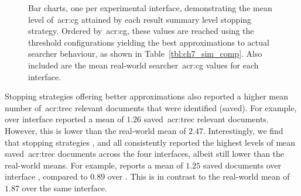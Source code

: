 \begin{figure}[p!]
    \centering
    \caption[Simulated and real-world~\gls{acr:cg} rankings]{Bar charts, one per experimental interface, demonstrating the mean level of~\gls{acr:cg} attained by each result summary level stopping strategy. Ordered by~\gls{acr:cg}, these values are reached using the threshold configurations yielding the best approximations to actual searcher behaviour, as shown in Table~\ref{tbl:ch7_sim_comp}. Also included are the mean real-world searcher~\gls{acr:cg} values for each interface.}
    \label{fig:ch7_sim_comparison_rankings}
\end{figure}

Stopping strategies offering better approximations also reported a higher mean number of~\gls{acr:trec} relevant documents that were identified (saved). For example,  over interface  reported a mean of $1.26$ saved~\gls{acr:trec} relevant documents. However, this is lower than the real-world mean of $2.47$. Interestingly, we find that stopping strategies ,  and  all consistently reported the highest levels of mean saved~\gls{acr:trec} documents across the four interfaces, albeit still lower than the real-world means. For example,  reports a mean of $1.25$ saved documents over interface , compared to $0.89$ over . This is in contrast to the real-world mean of $1.87$ over the same interface.


